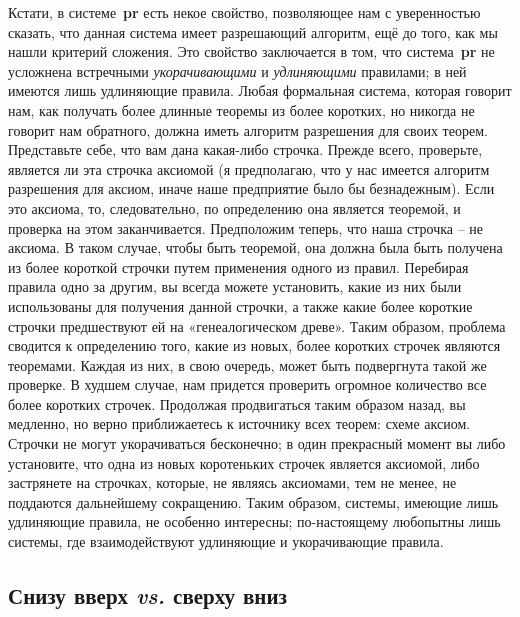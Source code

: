 \documentclass[../main.tex]{subfiles}
\begin{document}
Кстати, в системе~\textbf{pr} есть некое свойство, позволяющее нам с уверенностью сказать, что данная система имеет разрешающий алгоритм, ещё до того, как мы нашли критерий сложения.
Это свойство заключается в том, что система~\textbf{pr} не усложнена встречными \emph{укорачивающими} и \emph{удлиняющими} правилами; в ней имеются лишь удлиняющие правила.
Любая формальная система, которая говорит нам, как получать более длинные теоремы из более коротких, но никогда не говорит нам обратного, должна иметь алгоритм разрешения для своих теорем.
Представьте себе, что вам дана какая-либо строчка.
Прежде всего, проверьте, является ли эта строчка аксиомой (я предполагаю, что у нас имеется алгоритм разрешения для аксиом, иначе наше предприятие было бы безнадежным).
Если это аксиома, то, следовательно, по определению она является теоремой, и проверка на этом заканчивается.
Предположим теперь, что наша строчка \--- не аксиома.
В таком случае, чтобы быть теоремой, она должна была быть получена из более короткой строчки путем применения одного из правил.
Перебирая правила одно за другим, вы всегда можете установить, какие из них были использованы для получения данной строчки, а также какие более короткие строчки предшествуют ей на «генеалогическом древе».
Таким образом, проблема сводится к определению того, какие из новых, более коротких строчек являются теоремами.
Каждая из них, в свою очередь, может быть подвергнута такой же проверке.
В худшем случае, нам придется проверить огромное количество все более коротких строчек.
Продолжая продвигаться таким образом назад, вы медленно, но верно приближаетесь к источнику всех теорем: схеме аксиом.
Строчки не могут укорачиваться бесконечно; в один прекрасный момент вы либо установите, что одна из новых коротеньких строчек является аксиомой, либо застрянете на строчках, которые, не являясь аксиомами, тем не менее, не поддаются дальнейшему сокращению.
Таким образом, системы, имеющие лишь удлиняющие правила, не особенно интересны; по-настоящему любопытны лишь системы, где взаимодействуют удлиняющие и укорачивающие правила.


\subsection{Снизу вверх \emph{vs.} сверху вниз}
\end{document}
